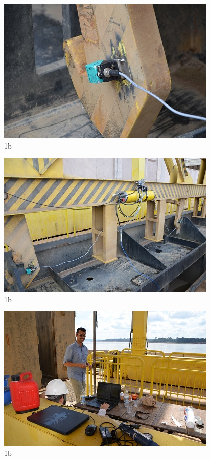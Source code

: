 \begin{figure}[h!]
  \centering
  \includegraphics[width=1\linewidth]{Fotos/Novembro2014/6.jpg}
  \caption{1b}
  \label{nov20135}
\end{figure}

\begin{figure}[h!]
  \centering
  \includegraphics[width=1\linewidth]{Fotos/Novembro2014/7.jpg}
  \caption{1b}
  \label{nov20136}
\end{figure}

\begin{figure}[h!]
  \centering
  \includegraphics[width=1\linewidth]{Fotos/Novembro2014/8.jpg}
  \caption{1b}
  \label{nov20136}
\end{figure}

